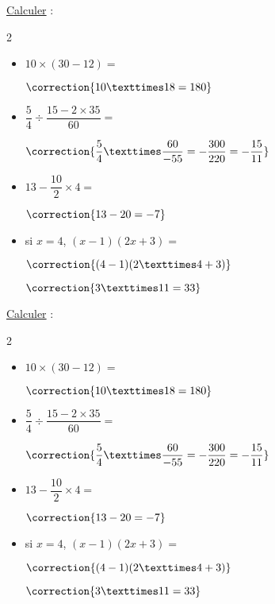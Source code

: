 \documentclass{automatisme}
\begin{document}
\newcommand{\Calculs}{
	\begin{frame}
		\uline{Calculer} :

		\begin{multicols}{2}
			\begin{itemize}
				\item $10 × (30 - 12) = $\vspace{0.5em}

				      $\correction{10 × 18 = 180}$\vspace{2em}
				\item $\dfrac{5}{4} ÷ \dfrac{15 - 2×35}{60} =$\vspace{0.5em}

				      $\correction{\dfrac{5}{4} × \dfrac{60}{-55} = -\dfrac{300}{220} = -\dfrac{15}{11}}$
				\item $13 - \dfrac{10}{2} × 4 =$\vspace{0.5em}

				      $\correction{13 - 20 = -7}$\vspace{1em}
				\item si $x = 4$, $(x - 1)(2x + 3) =$\vspace{0.5em}

				      $\correction{(4 - 1)(2×4 + 3)}$

				      $\correction{3×11 = 33}$
			\end{itemize}
		\end{multicols}
	\end{frame}
}

\Calculs

\newcommand{\makeCorrection}{}
\Calculs
\end{document}

